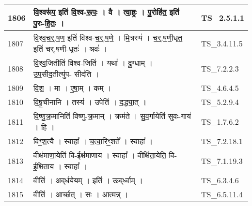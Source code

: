 \documentclass[17pt]{extarticle}
\begin{document}
\begin{longtable}{||p{0.4in}||p{4.9in}||p{0.9in}||}
    \hline
        
    1806 & वि॒श्वरू॑प॒ इति॑ वि॒श्व{-}रू॒पः॒   ।   वै   ।   त्वा॒ष्ट्रः   ।   पु॒रोहि॑त॒ इति॑ पु॒रः{-}हि॒तः॒   ।    & TS\_2.5.1.1       \\
    
    \hline
        
    1807 & वि॒श्व॒च॒र्॒.ष॒ण॒ इति॑ विश्व{-}च॒र्॒.ष॒णे॒   ।   मि॒त्रस्य॑   ।   च॒र्॒.ष॒णी॒धृत॒ इति॑ चर्.षणी{-}धृतः॑   ।   श्रवः॑   ।    & TS\_3.4.11.5       \\
    
    \hline
        
    1808 & वि॒श्व॒जितीति॑ विश्व{-}जिति॑   ।   यथा᳚   ।   दु॒ग्धाम्   ।   उ॒प॒सीद॒तीत्यु॑प{-} सीद॑ति   ।    & TS\_7.2.2.3       \\
    
    \hline
        
    1809 & वि॒श॒   ।   मा   ।   ए॒षा॒म्   ।   कम्   ।    & TS\_4.6.4.5       \\
    
    \hline
        
    1810 & वि॒षू॒चीना॑नि   ।   तस्य॑   ।   उपेति॑   ।   द॒द्ध्या॒त्   ।    & TS\_5.2.9.4       \\
    
    \hline
        
    1811 & वि॒ष्णु॒क्र॒मानिति॑ विष्णु{-}क्र॒मान्   ।   क्रम॑ते   ।   सु॒व॒र्गायेति॑ सुवः{-}गाय॑   ।   हि   ।    & TS\_1.7.6.2       \\
    
    \hline
        
    1812 & विꣳ॒॒श॒त्यै   ।   स्वाहा᳚   ।   च॒त्वा॒रिꣳ॒॒शते᳚   ।   स्वाहा᳚   ।    & TS\_7.2.18.1       \\
    
    \hline
        
    1813 & वीक्ष॑माणा॒येति॑ वि{-}ईक्ष॑माणाय   ।   स्वाहा᳚   ।   वीक्षि॑ता॒येति॒ वि{-}ई॒क्षि॒ता॒य॒   ।   स्वाहा᳚   ।    & TS\_7.1.19.3       \\
    
    \hline
        
    1814 & वीति॑   ।   अ॒द्‌र्ध॒ये॒य॒म्   ।   इति॑   ।   ऊ॒द्‌र्ध्वाम्   ।    & TS\_6.3.4.6       \\
    
    \hline
        
    1815 & वीति॑   ।   आ॒र्च्छ॒त्   ।   सः   ।   आ॒त्मन्न्   ।    & TS\_6.5.11.4       \\
    

\end{longtable}
\end{document}

